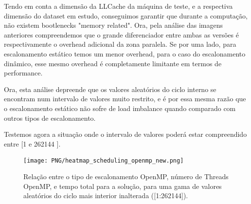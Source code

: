 \documentclass[a4paper]{article}
\begin{document}
    Tendo em conta a dimensão da LLCache da máquina de teste, e a respectiva dimensão do dataset em estudo, conseguimos garantir que durante a computação, não existem bootlenecks "memory related". Ora, pela análise das imagens anteriores compreendemos que o grande diferenciador entre ambas as versões é respectivamente o overhead adicional da zona paralela. Se por uma lado, para escalonamento estático temos um menor overhead, para o caso do escalonamento dinâmico, esse mesmo overhead é completamente limitante em termos de performance. \par 
    Ora, esta análise depreende que os valores aleatórios do ciclo interno se encontram num intervalo de valores muito restrito, e é por essa mesma razão que o escalonamento estático não sofre de load imbalance quando comparado com outros tipos de escalonamento. \par Testemos agora a situação onde o intervalo de valores poderá estar compreendido entre [1 e  262144 ].
    
      \begin{figure}[H]
    \centering
    \texttt{[image: PNG/heatmap\_scheduling\_openmp\_new.png]}
        \caption{ Relação entre o tipo de escalonamento OpenMP, número de Threads OpenMP, e tempo total para a solução, para uma gama de valores aleatórios do ciclo mais interior inalterada ([1:262144]). }
    \label{fig:heatmap_scheduling_openmp}
    \end{figure}
    
    
\end{document}
